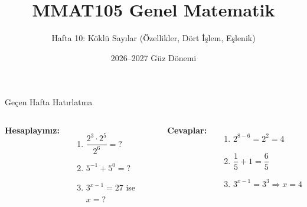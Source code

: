 \documentclass[aspectratio=169,11pt,handout]{beamer}
\title[MMAT105 -- Hafta 10]{MMAT105 Genel Matematik}
\subtitle{Hafta 10: Köklü Sayılar (Özellikler, Dört İşlem, Eşlenik)}
\author{}
\date{2026--2027 Güz Dönemi}
\begin{document}
\begin{frame}
\titlepage
\end{frame}


\begin{frame}{Geçen Hafta Hatırlatma}
\begin{columns}[t]
\textbf{Hesaplayınız:}
\begin{enumerate}
\item \(\dfrac{2^3\cdot 2^5}{2^6}=?\)
\item \(5^{-1}+5^{0}=?\)
\item \(3^{x-1}=27\) ise \(x=?\)
\end{enumerate}
\pause
\textbf{Cevaplar:}
\begin{enumerate}
\item \(2^{8-6}=2^2=4\)
\item \(\dfrac{1}{5}+1=\dfrac{6}{5}\)
\item \(3^{x-1}=3^3\Rightarrow x=4\)
\end{enumerate}
\end{columns}
\end{frame}
\end{document}
